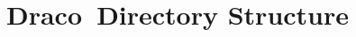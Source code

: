 \documentclass[note]{ResearchNote_pdf}
\newcommand{\draco}{Draco}
\begin{document}


\section{\draco\ Directory Structure}
\end{document}
